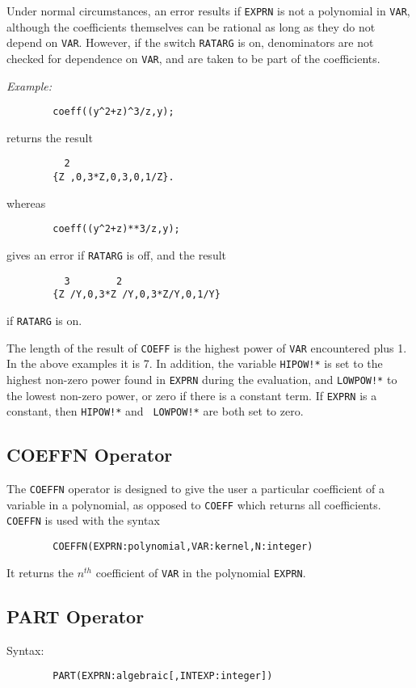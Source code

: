 Under normal circumstances, an error results if {\tt EXPRN} is not a
polynomial in {\tt VAR}, although the coefficients themselves can be
rational as long as they do not depend on {\tt VAR}.  However, if the
switch {\tt RATARG}  is on, denominators are not checked for
dependence on {\tt VAR}, and are taken to be part of the coefficients.

{\it Example:}
\begin{verbatim}
        coeff((y^2+z)^3/z,y);
\end{verbatim}
returns the result
\begin{verbatim}
          2
        {Z ,0,3*Z,0,3,0,1/Z}.
\end{verbatim}
whereas
\begin{verbatim}
        coeff((y^2+z)**3/z,y);
\end{verbatim}
gives an error if {\tt RATARG} is off, and the result
\begin{verbatim}
          3        2
        {Z /Y,0,3*Z /Y,0,3*Z/Y,0,1/Y}
\end{verbatim}
if {\tt RATARG} is on.

The length of the result of {\tt COEFF} is the highest power of {\tt VAR}
encountered plus 1.  In the above examples it is 7.  In addition, the
variable {\tt HIPOW!*} is set to the highest non-zero
power found in {\tt EXPRN} during the evaluation, and {\tt LOWPOW!*}
 to the lowest non-zero power, or zero if there is a
constant term.  If {\tt EXPRN} is a constant, then {\tt HIPOW!*} and {\tt
LOWPOW!*} are both set to zero.

\subsection{COEFFN Operator}

The {\tt COEFFN} operator is designed to give the user a particular
coefficient of a variable in a polynomial, as opposed to {\tt COEFF} which
returns all coefficients. {\tt COEFFN} is used with the syntax
\begin{verbatim}
        COEFFN(EXPRN:polynomial,VAR:kernel,N:integer)
\end{verbatim}
It returns the $n^{th}$ coefficient of {\tt VAR} in the polynomial
{\tt EXPRN}.

\subsection{PART Operator}
Syntax:
\begin{verbatim}
        PART(EXPRN:algebraic[,INTEXP:integer])
\end{verbatim}


